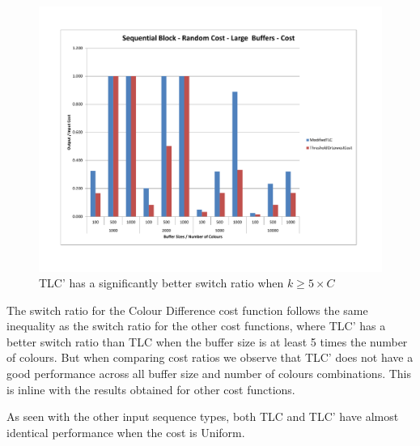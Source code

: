 \begin{figure}[ht]
\centering 
\includegraphics[scale=0.60]{Sequential-Block-rc-large-cost.pdf}
\caption{TLC' has a significantly better switch ratio when $k \geq 5 \times C$}
\label{sequentialBlockRCLargeCost}
\end{figure}   

The switch ratio for the Colour Difference cost function follows the same inequality as the switch ratio for the other cost functions, where TLC' has a better switch ratio than TLC when the buffer size is at least 5 times the number of colours. But when comparing cost ratios we observe that TLC' does not have a good performance across all buffer size and number of colours combinations. This is inline with the results obtained for other cost functions. 

As seen with the other input sequence types, both TLC and TLC' have almost identical performance when the cost is Uniform. 


